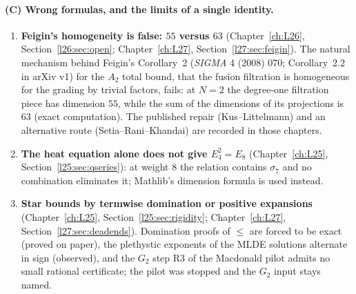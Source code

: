 \paragraph{(C) Wrong formulas, and the limits of a single identity.}
\begin{enumerate}
\item \textbf{Feigin's homogeneity is false: $55$ versus $63$} (Chapter~\ref{ch:L26}, Section~\ref{l26:sec:open};
  Chapter~\ref{ch:L27}, Section~\ref{l27:sec:feigin}). The natural mechanism behind Feigin's Corollary~2 (\emph{SIGMA} 4 (2008) 070; Corollary~2.2 in arXiv v1) for the $A_2$
  total bound, that the fusion filtration is homogeneous for the grading by trivial factors, fails: at $N=2$ the degree-one
  filtration piece has dimension $55$, while the sum of the dimensions of its projections is $63$ (exact computation).
  The published repair (Kus--Littelmann) and an alternative route (Setia--Rani--Khandai) are recorded in those chapters.
\item \textbf{The heat equation alone does not give $E_4^2=E_8$} (Chapter~\ref{ch:L25}, Section~\ref{l25:sec:qseries}):
  at weight $8$ the relation contains $\sigma_7$ and no combination eliminates it; Mathlib's dimension formula is used
  instead.
\item \textbf{Star bounds by termwise domination or positive expansions} (Chapter~\ref{ch:L25},
  Section~\ref{l25:sec:rigidity}; Chapter~\ref{ch:L27}, Section~\ref{l27:sec:deadends}). Domination proofs of $\le$ are
  forced to be exact (proved on paper), the plethystic exponents of the MLDE solutions alternate in sign (observed), and
  the $G_2$ step R3 of the Macdonald pilot admits no small rational certificate; the pilot was stopped and the $G_2$ input
  stays named.
\end{enumerate}

